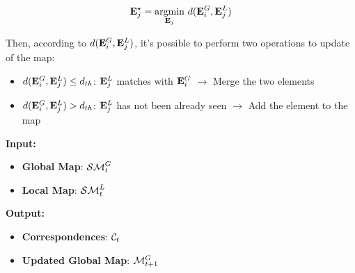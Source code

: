 \documentclass{article}
\begin{document}
	\begin{equation}
	\mathbf{E}_j^\star = \operatorname*{argmin}_{\mathbf{E}_j} \, d(\mathbf{E}_i^G,\mathbf{E}_j^L)
	\end{equation}
	
	
	
	Then, according to $d(\mathbf{E}_i^G,\mathbf{E}_j^L)$, it's possible to perform two operations to update of the map:
	
	 \begin{itemize}
	 	\item $d(\mathbf{E}_i^G,\mathbf{E}_j^L) \leq d_{th}$: $\mathbf{E}_j^L$ matches with $\mathbf{E}_i^G$ $\rightarrow$ Merge the two elements
	 	\item $d(\mathbf{E}_i^G,\mathbf{E}_j^L) > d_{th}$: $\mathbf{E}_j^L$ has not been already seen $\rightarrow$ Add the element to the map
	 \end{itemize}
	
	
	\noindent
	{\bf Input: }
	\begin{itemize}
		\item {\bf Global Map}: $\mathcal{SM}^G_t$
		\item {\bf Local Map}: $\mathcal{SM}^L_t$
	\end{itemize}
	\noindent
	{\bf Output: }
	\begin{itemize}
		\item {\bf Correspondences}: $\mathcal{C}_t$	
		\item {\bf Updated Global Map}: $\mathcal{M}_{t+1}^G$	
	\end{itemize}
	

	\clearpage	
	
	
	
\end{document}
